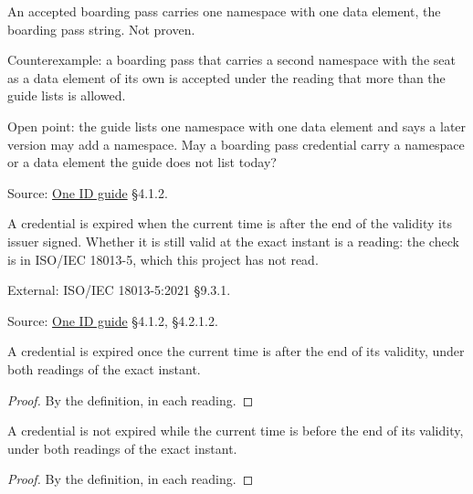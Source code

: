 \begin{theorem}
  \label{thm:bp-only-listed}
  An accepted boarding pass carries one namespace with one data element, the
  boarding pass string.  Not proven.

  Counterexample: a boarding pass that carries a second namespace with the
  seat as a data element of its own is accepted under the reading that more
  than the guide lists is allowed.

  Open point: the guide lists one namespace with one data element and says a
  later version may add a namespace.  May a boarding pass credential carry a
  namespace or a data element the guide does not list today?

  Source: \href{https://standards.atlassian.net/wiki/spaces/OneID/pages/2947416082/Technical+Implementation+Guide}{One ID guide} §4.1.2.
\end{theorem}

\begin{definition}
  \label{def:expired}
  A credential is expired when the current time is after the end of the
  validity its issuer signed.  Whether it is still valid at the exact instant
  is a reading: the check is in ISO/IEC 18013-5, which this project has not
  read.

  External: ISO/IEC 18013-5:2021 §9.3.1.

  Source: \href{https://standards.atlassian.net/wiki/spaces/OneID/pages/2947416082/Technical+Implementation+Guide}{One ID guide} §4.1.2, §4.2.1.2.
\end{definition}

\begin{theorem}
  \label{thm:expired-after}
  A credential is expired once the current time is after the end of its
  validity, under both readings of the exact instant.
\end{theorem}
\begin{proof}
  By the definition, in each reading.
\end{proof}

\begin{theorem}
  \label{thm:valid-before}
  A credential is not expired while the current time is before the end of its
  validity, under both readings of the exact instant.
\end{theorem}
\begin{proof}
  By the definition, in each reading.
\end{proof}

